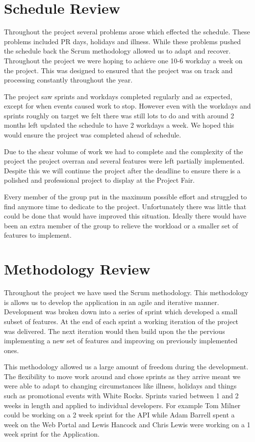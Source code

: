 \documentclass[11pt,a4paper]{report}
\begin{document}
\section{Schedule Review}
\label{sec:schedule-review}

Throughout the project several problems arose which effected the schedule. These problems included PR days, holidays and illness. While these problems pushed the schedule back the Scrum methodology allowed us to adapt and recover. Throughout the project we were hoping to achieve one 10-6 workday a week on the project. This was designed to ensured that the project was on track and processing constantly throughout the year.

The project saw sprints and workdays completed regularly and as expected, except for when events caused work to stop. However even with the workdays and sprints roughly on target we felt there was still lots to do and with around 2 months left updated the schedule to have 2 workdays a week. We hoped this would ensure the project was completed ahead of schedule. 

Due to the shear volume of work we had to complete and the complexity of the project the project overran and several features were left partially implemented. Despite this we will continue the project after the deadline to ensure there is a polished and professional project to display at the Project Fair. 

Every member of the group put in the maximum possible effort and struggled to find anymore time to dedicate to the project. Unfortunately there was little that could be done that would have improved this situation. Ideally there would have been an extra member of the group to relieve the workload or a smaller set of features to implement. 


\section{Methodology Review}
\label{sec:methodology-review}
Throughout the project we have used the Scrum methodology. This methodology is allows us to develop the application in an agile and iterative manner. Development was broken down into a series of sprint which developed a small subset of features. At the end of each sprint a working iteration of the project was delivered. The next iteration would then build upon the the pervious implementing a new set of features and improving on previously implemented ones. 

This methodology allowed us a large amount of freedom during the development. The flexibility to move work around and chose sprints as they arrive meant we were able to adapt to changing circumstances like illness, holidays and things such as promotional events with White Rocks. Sprints varied between 1 and 2 weeks in length and applied to individual developers. For example Tom Milner could be working on a 2 week sprint for the API while Adam Barrell spent a week on the Web Portal and Lewis Hancock and Chris Lewis were working on a 1 week sprint for the Application. 
\end{document}
